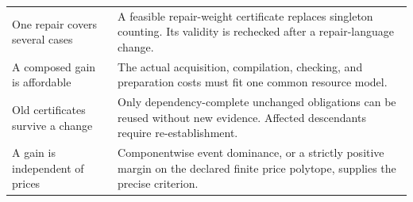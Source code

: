 \documentclass[11pt,letterpaper]{article}
\theoremstyle{plain}
\theoremstyle{definition}
\begin{document}
\begin{small}
\begin{longtable}{@{}p{}p{}@{}}
One repair covers several cases & A feasible repair-weight certificate replaces singleton counting. Its validity is rechecked after a repair-language change.\\
A composed gain is affordable & The actual acquisition, compilation, checking, and preparation costs must fit one common resource model.\\
Old certificates survive a change & Only dependency-complete unchanged obligations can be reused without new evidence. Affected descendants require re-establishment.\\
A gain is independent of prices & Componentwise event dominance, or a strictly positive margin on the declared finite price polytope, supplies the precise criterion.\\
\bottomrule
\end{longtable}\end{small}
\end{document}
